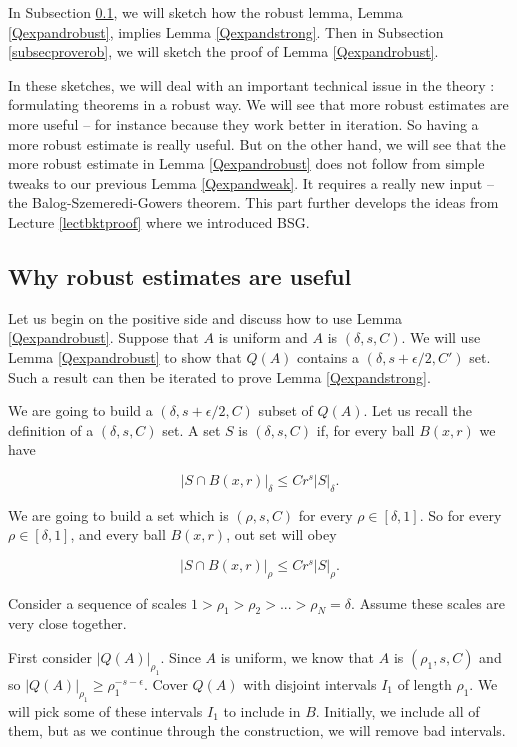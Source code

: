 \documentclass[12pt]{amsart}
\begin{document}
In Subsection \ref{subsecwhyrob},  we will sketch how the robust lemma,  Lemma \ref{Qexpandrobust},  implies Lemma \ref{Qexpandstrong}.   Then in Subsection \ref{subsecproverob},  we will sketch the proof of Lemma \ref{Qexpandrobust}. 

In these sketches,  we will deal with an important technical issue in the theory :  formulating theorems in a robust way.   We will see that more robust estimates are more useful -- for instance because they work better in iteration.   So having a more robust estimate is really useful.   But on the other hand,  we will see that the more robust estimate in Lemma \ref{Qexpandrobust} does not follow from simple tweaks to our previous Lemma \ref{Qexpandweak}.   It requires a really new input -- the Balog-Szemeredi-Gowers theorem.  This part further develops the ideas from Lecture \ref{lectbktproof} where we introduced BSG.  

\subsection{Why robust estimates are useful} \label{subsecwhyrob}

Let us begin on the positive side and discuss how to use Lemma \ref{Qexpandrobust}.    Suppose that $A$ is uniform and $A$ is $(\delta, s, C)$.   We will use Lemma \ref{Qexpandrobust} to show that $Q(A)$ contains a $(\delta,  s + \epsilon/2, C')$ set.   Such a result can then be iterated to prove Lemma \ref{Qexpandstrong}.

We are going to build a $(\delta, s+\epsilon/2, C)$ subset of $ Q(A)$.    Let us recall the definition of a $(\delta, s, C)$ set.  A set $S$ is $(\delta, s, C)$ if,  for every ball $B(x,r)$ we have

$$ |S \cap B(x,r)|_\delta \le C r^s |S|_\delta.$$

We are going to build a set which is $(\rho,  s, C)$ for every $\rho \in [\delta, 1]$.  So for every $\rho \in [\delta, 1]$, and every ball $B(x,r)$, out set will obey

\begin{equation} \label{psc}
|S \cap B(x,r)|_\rho \le C r^s |S|_\rho. 
\end{equation}


Consider a sequence of scales $1 > \rho_1 > \rho_2 > ...  > \rho_N = \delta$.   Assume these scales are very close together.

First consider $| Q(A) |_{\rho_1}$.   Since $A$ is uniform,  we know that $A$ is $(\rho_1, s , C)$ and so $| Q(A) |_{\rho_1} \ge \rho_1^{-s - \epsilon}$.   Cover $Q(A)$ with disjoint intervals $I_1$ of length $\rho_1$.    We will pick some of these intervals $I_1$ to include in $B$.   Initially,  we include all of them,  but as we continue through the construction,  we will remove bad intervals.
\end{document}
